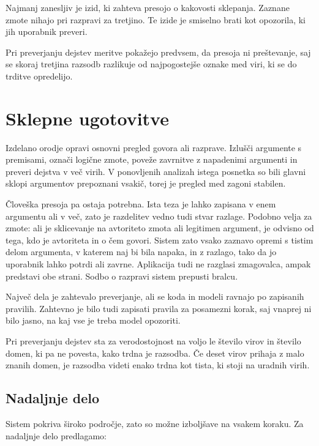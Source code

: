 \documentclass[a4paper, 12pt]{book}
\begin{document}
Najmanj zanesljiv je izid, ki zahteva presojo o kakovosti sklepanja. Zaznane
zmote nihajo pri razpravi za tretjino. Te izide je smiselno brati kot opozorila,
ki jih uporabnik preveri.

Pri preverjanju dejstev meritve pokažejo predvsem, da presoja ni preštevanje, saj
se skoraj tretjina razsodb razlikuje od najpogostejše oznake med viri, ki se do
trditve opredelijo. 


\chapter{Sklepne ugotovitve}
\label{ch:sklep}

Izdelano orodje opravi osnovni pregled govora ali razprave. Izlušči argumente s premisami, označi logične zmote, poveže zavrnitve z napadenimi
argumenti in preveri dejstva v več virih. V ponovljenih
analizah istega posnetka so bili glavni sklopi argumentov prepoznani vsakič,
torej je pregled med zagoni stabilen. 

Človeška presoja pa ostaja potrebna. Ista teza je lahko zapisana v enem
argumentu ali v več, zato je razdelitev vedno tudi stvar razlage. Podobno velja
za zmote: ali je sklicevanje na avtoriteto zmota ali legitimen argument, je
odvisno od tega, kdo je avtoriteta in o čem govori. Sistem zato vsako zaznavo
opremi s tistim delom argumenta, v katerem naj bi bila napaka, in z razlago,
tako da jo uporabnik lahko potrdi ali zavrne. Aplikacija tudi ne razglasi
zmagovalca, ampak predstavi obe strani. Sodbo o razpravi sistem prepusti bralcu.

Največ dela je zahtevalo preverjanje, ali se koda in modeli ravnajo po zapisanih pravilih. Zahtevno je bilo tudi zapisati pravila za posamezni korak,
saj vnaprej ni bilo jasno, na kaj vse je treba model opozoriti.

Pri preverjanju dejstev sta za verodostojnost na voljo le število virov in število domen, ki pa ne povesta, kako trdna je razsodba. Če deset virov prihaja z malo znanih domen, je razsodba videti enako trdna kot tista, ki stoji na uradnih virih.

\section{Nadaljnje delo}
\label{sec:nadaljnje-delo}

Sistem pokriva široko področje, zato so možne izboljšave na vsakem koraku. Za nadaljnje delo predlagamo:
\end{document}
